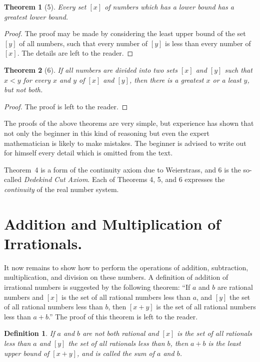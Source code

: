 \documentclass[a4paper,12pt]{book}[2004/02/16]
\providecommand{\hyperlink}[2]{#2}
\providecommand{\hypertarget}[2]{#2}
\theoremstyle{ilemma}
\theoremstyle{itheorem}
\newtheorem{theorem}{Theorem}
\theoremstyle{iother}
\theoremstyle{icorollary}
\theoremstyle{numcorollary}
\theoremstyle{idefinition}
\newtheorem*{definition}{Definition}
\begin{document}
\begin{theorem}[5]\hypertarget{thm5}{}
Every set $[x]$ of numbers which has a lower
bound has a greatest lower bound.
\end{theorem}
\begin{proof}
The proof may be made by considering the least
upper bound of the set $[y]$ of all numbers, such that every number of
$[y]$ is less than every number of $[x]$. The details are left to the
reader.
\end{proof}
\begin{theorem}[6]\hypertarget{thm6}{}
If all numbers are divided into two sets $[x]$ and
$[y]$ such that $x<y$ for every $x$ and $y$ of $[x]$ and $[y]$, then
there is a greatest $x$ or a least $y$, but not both.
\end{theorem}
\begin{proof}
The proof is left to the reader.
\end{proof}

The proofs of the above theorems are very simple, but experience has
shown that not only the beginner in this kind of reasoning but even
the expert mathematician is likely to make mistakes. The beginner is
advised to write out for himself every detail which is omitted from
the text.

Theorem~\hyperlink{thm4}{4} is a form of the continuity axiom due to Weierstrass, and \hyperlink{thm6}{6}
is the so-called \emph{Dedekind Cut Axiom}. Each of Theorems \hyperlink{thm4}{4}, \hyperlink{thm5}{5}, and
\hyperlink{thm6}{6} expresses the \emph{continuity} of the real number system.

\section{Addition and Multiplication of Irrationals.}\hypertarget{chIsec3}{}%

It now remains to show how to perform the operations of addition,
subtraction, multiplication, and division on these numbers. A
definition of addition of irrational numbers is suggested by the
following theorem: ``If $a$ and $b$ are rational numbers and $[x]$ is
the set of all rational numbers less than $a$, and $[y]$ the set of
all rational numbers less than $b$, then $[x+y]$ is the set of all
rational numbers less than $a+b$.'' The proof of this theorem is left
to the reader.

\begin{definition}
If $a$ and $b$ are not both rational and $[x]$ is the
set of all rationals less than $a$ and $[y]$ the set of all rationals
less
than $b$, then $a+b$ is the least upper bound of $[x+y]$, and is
called \emph{the sum} of $a$ and $b$.
\end{definition}
\end{document}
